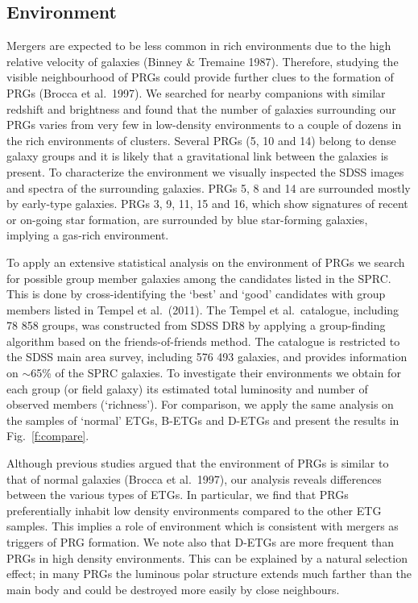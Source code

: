 \documentclass[useAMS,usenatbib]{mn2e}
\begin{document}
\subsection{Environment}
Mergers are expected to be less common in rich environments due to the high relative velocity of galaxies (Binney \& Tremaine
1987). Therefore, studying the visible neighbourhood of PRGs could provide further clues to the formation of PRGs (Brocca et al.\ 1997).
We searched for nearby companions with similar redshift and brightness and found that the number of galaxies surrounding our PRGs varies from very few in low-density environments to a couple of dozens in the rich environments of clusters. Several PRGs (5, 10 and 14) belong to dense galaxy groups and it is likely that a gravitational link between the galaxies is present. To characterize the environment we visually inspected the SDSS images and spectra of the surrounding galaxies.
PRGs 5, 8 and 14 are surrounded mostly by early-type galaxies. PRGs 3, 9, 11, 15 and 16, which show signatures of recent or on-going star formation, are surrounded by blue star-forming galaxies, implying a gas-rich environment.

To apply an extensive statistical analysis on the environment of PRGs we search for possible group member galaxies among the candidates listed in the SPRC. 
This is done by cross-identifying the `best' and `good' candidates with group members listed in Tempel et al.\ (2011). 
The Tempel et al.\ catalogue, including 78 858 groups, was constructed from SDSS DR8 by applying a group-finding algorithm based on the friends-of-friends method. The catalogue is restricted to the SDSS main area survey, including 576 493 galaxies, and provides information on $\sim$65\% of the SPRC galaxies. To investigate their environments we obtain for each group (or field galaxy) its estimated total luminosity and number of observed members (`richness').
For comparison, we apply the same analysis on the samples of `normal' ETGs, B-ETGs and D-ETGs and present the results in Fig.\ \ref{f:compare}.

Although previous studies argued that the environment of PRGs is similar to that of normal galaxies (Brocca et al.\ 1997), our analysis reveals differences between the various types of ETGs.
In particular, we find that PRGs preferentially inhabit low density environments compared to the other ETG samples. This implies a role of environment which is consistent with mergers as triggers of PRG formation. We note also that D-ETGs are more frequent than PRGs in high density environments. This can be explained by a natural selection effect; in many PRGs the luminous polar structure extends much farther than the main body and could be destroyed more easily by close neighbours.
\end{document}
